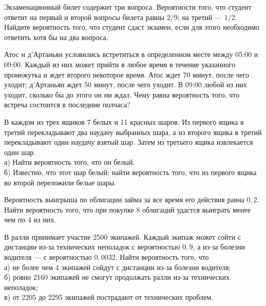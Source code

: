 \newpage\setcounter{zad}{0}



\begin{zkrW}{20}\noindent 
	Экзаменационный билет содержит три вопроса. Вероятности того, что студент ответит на первый и второй вопросы билета равны $2/9$; на третий --- $1/2$. Найдите вероятность того, что студент сдаст экзамен, если для этого необходимо ответить хотя бы на два вопроса.
 
\end{zkrW}

\begin{zkrW}{20}\noindent 
	Атос и д'Артаньян условились встретиться в определенном месте между 05:00 и 09:00. Каждый из них может прийти в любое время в течение указанного промежутка и ждет второго некоторое время. Атос ждет 70 минут, после чего уходит; д'Артаньян ждет 50 минут, после чего уходит. В 09:00 любой из них уходит, сколько бы до этого он ни ждал. Чему равна вероятность того, что встреча состоится в последние полчаса?
 
\end{zkrW}

\begin{zkrW}{20}\noindent 
	В каждом из трех ящиков 7 белых и 11 красных шаров. Из первого ящика в третий перекладывают два наудачу выбранных шара, а из второго ящика в третий перекладывают один наудачу взятый шар. Затем из третьего ящика извлекается один шар. \\ \indent а) Найти вероятность того, что он белый. \\ \indent б) Известно, что этот шар белый; найти вероятность того, что из первого ящика во второй переложили белые шары.
 
\end{zkrW}

\begin{zkrW}{20}\noindent 
	Вероятность выигрыша по облигации займа за все время его действия равна $0{,}2$. Найти вероятность того, что при покупке 8 облигаций удастся выиграть менее чем по 4 из них.
 
\end{zkrW}

\begin{zkrW}{20}\noindent 
	В ралли принимает участие 2500 экипажей. Каждый экипаж может сойти с дистанции из-за технических неполадок с вероятностью $0{,}9$, а из-за болезни водителя --- с вероятностью $0{,}0032$. Найти вероятность того, что \\ \indent а) не более чем 4 экипажей сойдут с дистанции из-за болезни водителя; \\ \indent б) ровно 2160 экипажей не смогут продолжать ралли из-за технических неполадок; \\ \indent в) от 2205 до 2295 экипажей пострадают от технических проблем.
 
\end{zkrW}

